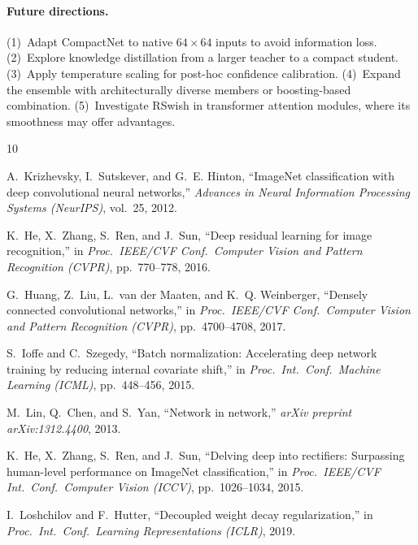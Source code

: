\documentclass[11pt,letterpaper]{article}
\begin{document}
\paragraph{Future directions.}
(1)~Adapt CompactNet to native $64\!\times\!64$ inputs to avoid information loss.
(2)~Explore knowledge distillation from a larger teacher to a compact student.
(3)~Apply temperature scaling for post-hoc confidence calibration.
(4)~Expand the ensemble with architecturally diverse members or boosting-based
combination.
(5)~Investigate RSwish in transformer attention modules, where its smoothness may
offer advantages.

\begin{thebibliography}{10}

A.~Krizhevsky, I.~Sutskever, and G.~E. Hinton,
``ImageNet classification with deep convolutional neural networks,''
\textit{Advances in Neural Information Processing Systems (NeurIPS)}, vol.~25, 2012.

K.~He, X.~Zhang, S.~Ren, and J.~Sun,
``Deep residual learning for image recognition,''
in \textit{Proc.\ IEEE/CVF Conf.\ Computer Vision and Pattern Recognition (CVPR)},
pp.~770--778, 2016.

G.~Huang, Z.~Liu, L.~van der Maaten, and K.~Q. Weinberger,
``Densely connected convolutional networks,''
in \textit{Proc.\ IEEE/CVF Conf.\ Computer Vision and Pattern Recognition (CVPR)},
pp.~4700--4708, 2017.

S.~Ioffe and C.~Szegedy,
``Batch normalization: Accelerating deep network training by reducing internal
covariate shift,''
in \textit{Proc.\ Int.\ Conf.\ Machine Learning (ICML)}, pp.~448--456, 2015.

M.~Lin, Q.~Chen, and S.~Yan,
``Network in network,''
\textit{arXiv preprint arXiv:1312.4400}, 2013.

K.~He, X.~Zhang, S.~Ren, and J.~Sun,
``Delving deep into rectifiers: Surpassing human-level performance on ImageNet
classification,''
in \textit{Proc.\ IEEE/CVF Int.\ Conf.\ Computer Vision (ICCV)},
pp.~1026--1034, 2015.

I.~Loshchilov and F.~Hutter,
``Decoupled weight decay regularization,''
in \textit{Proc.\ Int.\ Conf.\ Learning Representations (ICLR)}, 2019.


\end{thebibliography}
\end{document}
